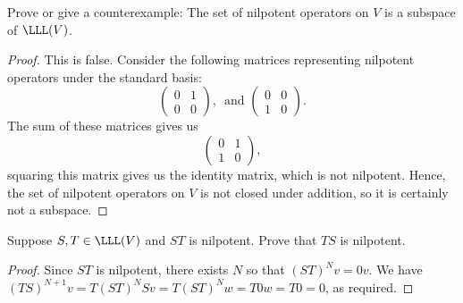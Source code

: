 \begin{exercise}{8}
  Prove or give a counterexample: The set of nilpotent operators on $V$ is a subspace of $\LLL(V)$.
\end{exercise}
\begin{proof}
 This is false. Consider the following matrices representing nilpotent operators under the standard basis:
 \[
 \begin{pmatrix}
     0 & 1\\
     0 & 0
 \end{pmatrix},\,\text{ and }
 \begin{pmatrix}
     0 & 0\\
     1 & 0
 \end{pmatrix}.
 \]
 The sum of these matrices gives us
 \[
 \begin{pmatrix}
     0 & 1\\
     1 & 0
 \end{pmatrix},
 \]
 squaring this matrix gives us the identity matrix, which is not nilpotent. Hence, the set of nilpotent operators on $V$ is not closed under addition, so it is certainly not a subspace.
\end{proof}

\begin{exercise}{9}
  Suppose $S,T\in\LLL(V)$ and $ST$ is nilpotent. Prove that $TS$ is nilpotent.
\end{exercise}
\begin{proof}
 Since $ST$ is nilpotent, there exists $N$ so that $(ST)^Nv =0v$. We have $(TS)^{N+1}v =T(ST)^NSv =T(ST)^Nw =T0w =T0 =0$, as required.
\end{proof}

